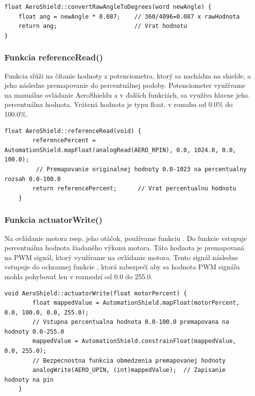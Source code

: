 \begin{lstlisting}[caption={Zdrojový kód funkcie convertRawAngleToDegrees.},captionpos=b]
float AeroShield::convertRawAngleToDegrees(word newAngle) {  
	float ang = newAngle * 0.087;    // 360/4096=0.087 x rawHodnota                             
	return ang;                      // Vrat hodnotu
}
\end{lstlisting}


\subsubsection{Funkcia referenceRead()}

Funkcia  slúži na čítanie hodnoty z potenciometra, ktorý sa nachádza na shielde, a jeho následne premapovanie do percentuálnej podoby. Potenciometer využívame na manuálne ovládanie AeroShieldu a v ďalších funkciách, sa využíva hlavne jeho percentuálna hodnota. Vrátená hodnota je typu float, v rozsahu od 0.0\% do 100.0\%. 

\begin{lstlisting}[caption={Zdrojový kód funkcie referenceRead.},captionpos=b]
	  float AeroShield::referenceRead(void) {      
		referencePercent = AutomationShield.mapFloat(analogRead(AERO_RPIN), 0.0, 1024.0, 0.0, 100.0);  
		 // Premapovanie originalnej hodnoty 0.0-1023 na percentualny rozsah 0.0-100.0
		return referencePercent;      // Vrat percentualnu hodnotu 
	}
\end{lstlisting}
	
\subsubsection{Funkcia actuatorWrite()}	
	
Na ovládanie motora resp. jeho otáčok, používame funkciu . Do funkcie vstupuje percentuálna hodnota žiadaného výkonu motora. Táto hodnota je premapovaná na PWM signál, ktorý využívame na ovládanie motora. Tento signál následne vstupuje do ochrannej funkcie , ktorá zabezpečí aby sa hodnota PWM signálu mohla pohybovať len v rozmedzí od 0.0 do 255.0. 
	
	
\begin{lstlisting}[caption={Zdrojový kód funkcie actuatorWrite.},captionpos=b]
	void AeroShield::actuatorWrite(float motorPercent) {   
		float mappedValue = AutomationShield.mapFloat(motorPercent, 0.0, 100.0, 0.0, 255.0);       
		// Vstupna percentualna hodnota 0.0-100.0 premapovana na hodnoty 0.0-255.0
		mappedValue = AutomationShield.constrainFloat(mappedValue, 0.0, 255.0);  
		// Bezpecnostna funkcia obmedzenia premapovanej hodnoty
		analogWrite(AERO_UPIN, (int)mappedValue);  // Zapisanie hodnoty na pin
	}
\end{lstlisting}
	
